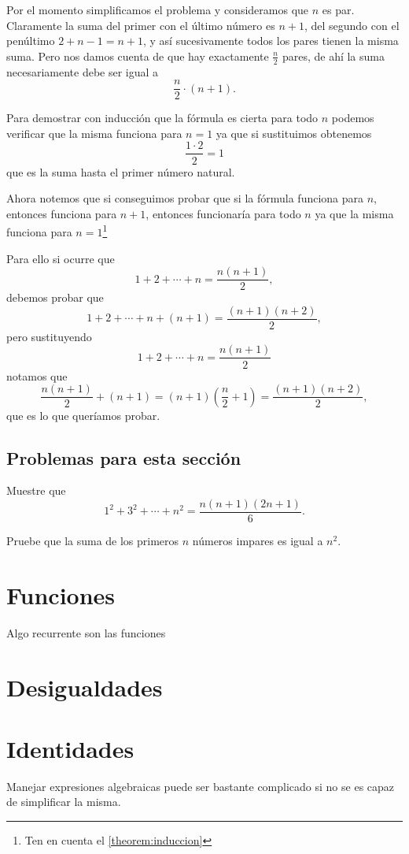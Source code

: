 Por el momento simplificamos el problema
y consideramos que $n$ es par. Claramente
la suma del primer con el último
número es $n + 1$,
del segundo con el penúltimo $2 + n - 1 = n + 1$,
y así sucesivamente todos los pares tienen la
misma suma. Pero nos damos cuenta de que
hay exactamente $\frac n2$ pares, de ahí la suma
necesariamente debe ser igual a
\[\frac n2 \cdot (n + 1).\]

Para demostrar con inducción que la fórmula
es cierta para todo $n$
podemos verificar que la misma funciona
para $n = 1$ ya que si sustituimos obtenemos
\[\frac{1 \cdot 2}{2} = 1\]
que es la suma hasta el primer número natural.

Ahora notemos que si conseguimos probar que
si la fórmula funciona para $n$, entonces
funciona para $n + 1$, entonces funcionaría
para todo $n$ ya que la misma funciona para
$n = 1$\footnote{Ten en cuenta el \autoref{theorem:induccion}}

Para ello si ocurre que
\[1 + 2 + \cdots + n = \frac{n(n + 1)}2,\]
debemos probar que
\[1 + 2 + \cdots + n + (n + 1) = \frac{(n + 1)(n + 2)}2,\]
pero sustituyendo
\[1 + 2 + \cdots + n = \frac{n(n + 1)}2\]
notamos que
\[\frac{n(n + 1)}2 + (n + 1) = (n + 1)\left(\frac n2 + 1\right) = \frac{(n + 1)(n + 2)}2,\]
que es lo que queríamos probar.

\subsection*{Problemas para esta sección}
\begin{problem}
Muestre que
\[1^2 + 3^2 + \cdots + n^2 = \frac{n(n + 1)(2n + 1)}6.\]
\end{problem}

\begin{problem}
Pruebe que la suma de los primeros
$n$ números impares es igual a $n^2$.
\end{problem}

\section{Funciones}
Algo recurrente son las funciones

\section{Desigualdades}

\section{Identidades}
Manejar expresiones algebraicas puede ser
bastante complicado si no se es capaz
de simplificar la misma.

